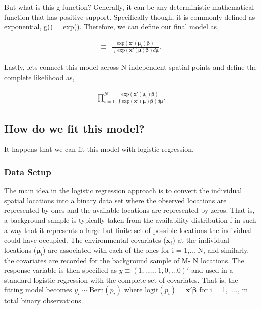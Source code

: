 \documentclass[12pt]{article}
\begin{document}
But what is this g function? Generally, it can be any deterministic mathematical function that has positive support. Specifically though, it is commonly defined as exponential, g() = exp(). Therefore, we can define our final model as,

\begin{align*}
[\boldsymbol{\mu}_{i}| \boldsymbol{\beta}] \equiv &  \frac{\text{exp}(\textbf{x}'(\boldsymbol{\mu}_{i}) \boldsymbol{\beta})}{\int \text{exp}(\textbf{x}'(\boldsymbol{\mu}) \boldsymbol{\beta})d\boldsymbol{\mu}}.
\end{align*}

Lastly, lets connect this model across N independent spatial points and define the complete likelihood as,

\begin{align*}
 \prod_{i=1}^{N}  \frac{\text{exp}(\textbf{x}'(\boldsymbol{\mu}_{i}) \boldsymbol{\beta})}{\int \text{exp}(\textbf{x}'(\boldsymbol{\mu}) \boldsymbol{\beta})d\boldsymbol{\mu}}.
\end{align*}

\subsection{How do we fit this model?}

It happens that we can fit this model with logistic regression. \\

\subsubsection{Data Setup}
The main idea in the logistic regression approach is to convert the individual spatial locations into a binary data set where the observed locations are represented by ones and the available locations are represented by zeros. That is, a background sample is typically taken from the availability distribution f in such a way that it represents a large but finite set of possible locations the individual could have occupied. The environmental covariates ($\textbf{x}_{i}$) at the individual locations ($\boldsymbol{\mu}_{i}$) are associated with each of the ones for i = 1,... N, and similarly, the covariates are recorded for the background sample of M- N locations. The response variable is then specified as $y \equiv (1,.....,1,0,...0)'$ and used in a standard logistic regression with the complete set of covariates. That is, the fitting model becomes $y_{i}\sim \text{Bern}(p_{i})$ where $\text{logit}(p_i) = \textbf{x}'\boldsymbol{\beta}$ for i = 1, ...., m total binary observations.
\end{document}
